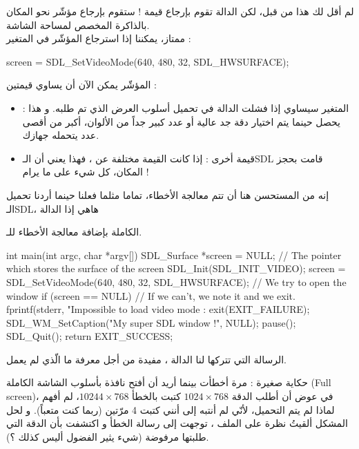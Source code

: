 لم أقل لك هذا من قبل، لكن الدالة
تقوم بإرجاع قيمة ! ستقوم بإرجاع مؤشّر نحو المكان بالذاكرة المخصص لمساحة الشاشة.\\
ممتاز، يمكننا إذا استرجاع المؤشّر في المتغير 
 :

\begin{Csource}
screen = SDL_SetVideoMode(640, 480, 32, SDL_HWSURFACE);
\end{Csource}

المؤشّر يمكن الآن أن يساوي قيمتين :

\begin{itemize}
	\item {} :
	المتغير 
	سيساوي
	إذا فشلت الدالة
	في تحميل أسلوب العرض الذي تم طلبه. و هذا يحصل حينما يتم اختيار دقة جد عالية أو عدد كبير جداً من الألوان، أكبر من أقصى عدد يتحمله جهازك.
	\item قيمة أخرى : إذا كانت القيمة مختلفة عن 
	،
	فهذا يعني أن الـ\textenglish{SDL}
	قامت بحجز المكان، كل شيء على ما يرام !
\end{itemize}

إنه من المستحسن هنا أن تتم معالجة الأخطاء، تماما مثلما فعلنا حينما أردنا تحميل الـ\textenglish{SDL}،
هاهي إذا الدالة

الكاملة بإضافة معالجة الأخطاء للـ.

\begin{Csource}
int main(int argc, char *argv[])
{
	SDL_Surface *screen = NULL; // The pointer which stores the surface of the screen
	SDL_Init(SDL_INIT_VIDEO);
	screen = SDL_SetVideoMode(640, 480, 32, SDL_HWSURFACE); // We try to open the window
	if (screen  == NULL) // If we can't, we note it and we exit.
	{
		fprintf(stderr, "Impossible to load video mode :%
		exit(EXIT_FAILURE);
	}
	SDL_WM_SetCaption("My super SDL window !", NULL);
	pause();
	SDL_Quit();
	return EXIT_SUCCESS;
}
\end{Csource}

الرسالة التي تتركها لنا الدالة
،
مفيدة من أجل معرفة ما الّذي لم يعمل.

\begin{information}
حكاية صغيرة : مرة أخطأت بينما أريد أن أفتح نافذة بأسلوب الشاشة الكاملة 
(\textenglish{Full screen})،
في عوض أن أطلب الدقة
$1024 \times 768$
كتبت بالخطأ 
$10244 \times 768$،
لم أفهم لماذا لم يتم التحميل، لأنّي لم أنتبه إلى أنني كتبت 4 مرّتين (ربما كنت متعباً). و لحل المشكل ألقيتُ نظرة على الملف 
،
توجهت إلى رسالة الخطأ و اكتشفت بأن الدقة التي طلبتها مرفوضة (شيء يثير الفضول أليس كذلك ؟).
\end{information}

